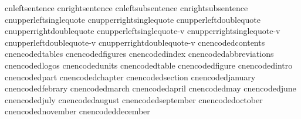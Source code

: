 \startencoding[c-uni]
   cnleftsentence            {}
   cnrightsentence           {}
   cnleftsubsentence         {}
   cnrightsubsentence        {}
   cnupperleftsinglequote    {}
   cnupperrightsinglequote   {}
   cnupperleftdoublequote    {}
   cnupperrightdoublequote   {}
   cnupperleftsinglequote-v  {}
   cnupperrightsinglequote-v {}
   cnupperleftdoublequote-v  {}
   cnupperrightdoublequote-v {}
   cnencodedcontents         {}
   cnencodedtables           {}
   cnencodedfigures          {}
   cnencodedindex            {}
   cnencodedabbreviations    {}
   cnencodedlogos            {}
   cnencodedunits            {}
   cnencodedtable            {}
   cnencodedfigure           {}
   cnencodedintro            {}
   cnencodedpart             {}
   cnencodedchapter          {}
   cnencodedsection          {}
   cnencodedjanuary          {}
   cnencodedfebrary          {}
   cnencodedmarch            {}
   cnencodedapril            {}
   cnencodedmay              {}
   cnencodedjune             {}
   cnencodedjuly             {}
   cnencodedaugust           {}
   cnencodedseptember        {}
   cnencodedoctober          {}
   cnencodednovember         {}
   cnencodeddecember         {}
